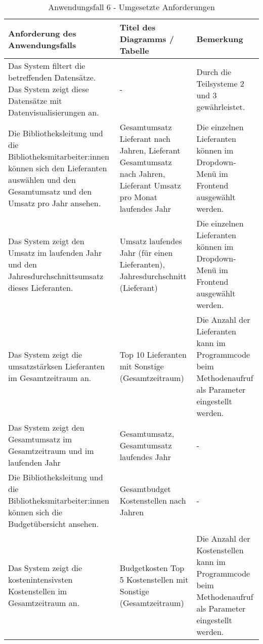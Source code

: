 \begingroup
    \setlength{\tabcolsep}{12pt} %
    \renewcommand{\arraystretch}{1.2} 
    \begin{table}[H]
        \centering
        \large
        \begin{adjustbox}{max width=\textwidth}
        \begin{tabular}{p{}p{}p{}}
           \toprule
           Anforderung des Anwendungsfalls        &Titel des Diagramms / Tabelle&Bemerkung\\
           \midrule
           Das System filtert die betreffenden Datensätze. Das System zeigt diese Datensätze mit Datenvisualisierungen an.&-&Durch die Teilsysteme 2 und 3 gewährleistet.\\
           Die Bibliotheksleitung und die Bibliotheksmitarbeiter:innen können sich den Lieferanten auswählen und den Gesamtumsatz und den Umsatz pro Jahr ansehen.&Gesamtumsatz Lieferant nach Jahren, Lieferant Gesamtumsatz nach Jahren, Lieferant Umsatz pro Monat laufendes Jahr&Die einzelnen Lieferanten können im Dropdown-Menü im Frontend ausgewählt werden.\\
           Das System zeigt den Umsatz im laufenden Jahr und den Jahresdurchschnittsumsatz dieses Lieferanten.&Umsatz laufendes Jahr (für einen Lieferanten), Jahresdurchschnitt (Lieferant)&Die einzelnen Lieferanten können im Dropdown-Menü im Frontend ausgewählt werden.\\
           Das System zeigt die umsatzstärksen Lieferanten im Gesamtzeitraum an.&Top 10 Lieferanten mit Sonstige (Gesamtzeitraum) &Die Anzahl der Lieferanten kann im Programmcode beim Methodenaufruf als Parameter eingestellt werden.\\
           Das System zeigt den Gesamtumsatz im Gesamtzeitraum und im laufenden Jahr&Gesamtumsatz, Gesamtumsatz laufendes Jahr&-\\
           Die Bibliotheksleitung und die Bibliotheksmitarbeiter:innen können sich die Budgetübersicht ansehen.&Gesamtbudget Kostenstellen nach Jahren&-\\
           Das System zeigt die kostenintensivsten Kostenstellen im Gesamtzeitraum an.&Budgetkosten Top 5 Kostenstellen mit Sonstige (Gesamtzeitraum)&Die Anzahl der Kostenstellen kann im Programmcode beim Methodenaufruf als Parameter eingestellt werden.\\
        \bottomrule
        \end{tabular}
        \end{adjustbox}
        \caption{%
            Anwendungsfall 6 - Umgesetzte Anforderungen
        }
        \label{tab:Anwendungsfall 6 - Umgesetzte Anforderungen}
        \end{table}
\endgroup

